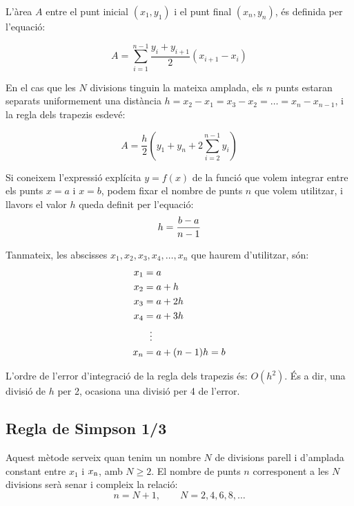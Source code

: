 L'àrea $A$ entre el punt inicial $(x_1, y_1)$ i el punt final $(x_n, y_n)$, és definida per l'equació:

 \begin{equation}\label{eq:trap-uneven}
    A = \sum_{i=1}^{n-1} \frac{y_i + y_{i+1}}{2} (x_{i+1}-x_i)
 \end{equation}

En el cas que les $N$ divisions tinguin la mateixa amplada, els  $n$ punts estaran separats uniformement una distància $h = x_2-x_1 = x_3-x_2 = \dots = x_n-x_{n-1}$, i la regla dels trapezis esdevé:

 \begin{equation}\label{eq:trap}
    A = \frac{h}{2} \left( y_1 + y_n + 2 \sum_{i=2}^{n-1} y_i \right)
 \end{equation}

Si coneixem l'expressió explícita $y=f(x)$ de la funció que volem integrar entre els punts $x=a$ i $x=b$, podem fixar el nombre de punts $n$ que volem utilitzar, i llavors el valor $h$ queda definit per l'equació:
\begin{equation}\label{eq:trap_1}
    h = \frac{b-a}{n-1}\\
\end{equation}

Tanmateix, les abscisses $x_1, x_2, x_3,x_4, \dotsc , x_n$ que haurem d'utilitzar, són:
\begin{align}\label{eq:trap_2}
    x_1 &= a \notag\\
    x_2 &= a + h \notag\\
    x_3 &= a + 2 h \notag\\
    x_4 &= a + 3 h\\
    {} &\hspace{1.5ex}\vdots {} \notag\\
    x_n &= a + (n-1)h =b \notag
\end{align}

L'ordre de l'error d'integració de la regla dels trapezis és: $O(h^2)$. És a dir, una divisió de $h$ per 2, ocasiona una divisió per 4 de l'error.

\subsection{Regla de Simpson 1/3}

Aquest mètode serveix quan tenim un nombre  $N$ de divisions parell i d'amplada constant entre $x_1$ i $x_\mathrm{n}$, amb $N \geq 2$.  El nombre de punts $n$ corresponent a les  $N$ divisions serà senar i compleix la relació: 
\begin{equation}
	n = N+1, \qquad N = 2, 4, 6, 8, \dots
\end{equation}

